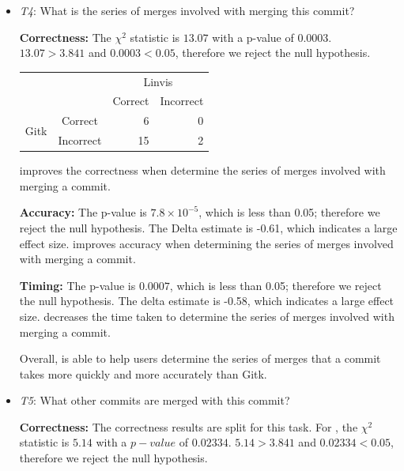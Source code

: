 \begin{itemize}
  \item \emph{T4}: What is the series of merges involved with merging this
    commit?

    \textbf{Correctness:}
    The $\chi^2$ statistic is $13.07$ with a p-value of $0.0003$.
    $13.07 > 3.841$ and $0.0003 < 0.05$, therefore we reject the null
    hypothesis.

    \vspace{2mm}
    \begin{tabular}{cc|rr}
                            &           & \multicolumn{2}{c}{Linvis}\\
                            &           & Correct                      & Incorrect\\\hline
      \multirow{2}{*}{Gitk} & Correct   & 6                            & 0\\
                            & Incorrect & 15                           & 2\\
    \end{tabular}
    \vspace{3mm}

    \tool improves the correctness when determine the series of merges
    involved with merging a commit.

    \textbf{Accuracy:} The p-value is $7.8 \times 10^{-5}$, which is
    less than 0.05; therefore we reject the null hypothesis. The Delta
    estimate is -0.61, which indicates a large effect size. \tool
    improves accuracy when determining the series of merges involved
    with merging a commit.

    \textbf{Timing:}
    The p-value is $0.0007$, which is less than 0.05; therefore we
    reject the null hypothesis. The delta estimate is -0.58, which
    indicates a large effect size. \tool decreases the time taken to
    determine the series of merges involved with merging a commit.

    Overall, \tool is able to help users determine the series of merges
    that a commit takes more quickly and more accurately than Gitk.

  \item \emph{T5}: What other commits are merged with this commit?

    \textbf{Correctness:}
    The correctness results are split for this task. For \comA, the
    $\chi^2$ statistic is $5.14$ with a $p-value$ of $0.02334$. $5.14 >
    3.841$ and $0.02334 < 0.05$, therefore we reject the null
    hypothesis.


\end{itemize}
